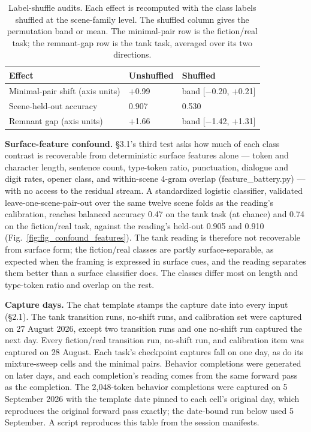 \documentclass[11pt]{article}
\begin{document}
\begin{table}[htbp]\centering\small
\caption{Label-shuffle audits. Each effect is recomputed with the class labels
shuffled at the scene-family level. The shuffled column gives the permutation band
or mean. The minimal-pair row is the fiction/real task; the remnant-gap row is the
tank task, averaged over its two directions.}
\begin{tabularx}{\linewidth}{lll}
\toprule
Effect & Unshuffled & Shuffled \\
\midrule
Minimal-pair shift (axis units) & +0.99 & band [$-$0.20, +0.21] \\
\addlinespace
Scene-held-out accuracy & 0.907 & 0.530 \\
\addlinespace
Remnant gap (axis units) & +1.66 & band [$-$1.42, +1.31] \\
\bottomrule
\end{tabularx}
\end{table}


\textbf{Surface-feature confound.} \S3.1's third test asks how much of each class contrast is
recoverable from deterministic surface features alone — token and character length,
sentence count, type-token ratio, punctuation, dialogue and digit rates, opener class,
and within-scene 4-gram overlap (feature\_battery.py) — with no access to the residual
stream. A standardized logistic classifier, validated leave-one-scene-pair-out over the
same twelve scene folds as the reading's calibration, reaches balanced accuracy 0.47 on
the tank task (at chance) and 0.74 on the fiction/real task, against the reading's
held-out 0.905 and 0.910 (Fig.~\ref{fig:fig_confound_features}). The tank reading is therefore not
recoverable from surface form; the fiction/real classes are partly surface-separable, as
expected when the framing is expressed in surface cues, and the reading separates them
better than a surface classifier does. The classes differ most on length and type-token
ratio and overlap on the rest.

\textbf{Capture days.} The chat template stamps the capture date into every input (\S2.1).
The tank transition runs, no-shift runs, and calibration set were captured on 27
August 2026, except two transition runs and one no-shift run captured the next day.
Every fiction/real transition run, no-shift run, and calibration item was captured on
28 August. Each task's checkpoint captures fall on one day, as do its mixture-sweep
cells and the minimal pairs. Behavior completions were generated on later days, and each completion's reading
comes from the same forward pass as the completion. The 2,048-token behavior completions were captured on 5 September 2026 with the
template date pinned to each cell's original day, which reproduces the original
forward pass exactly; the date-bound run below used 5 September. A
script reproduces this table from the session manifests.
\end{document}
